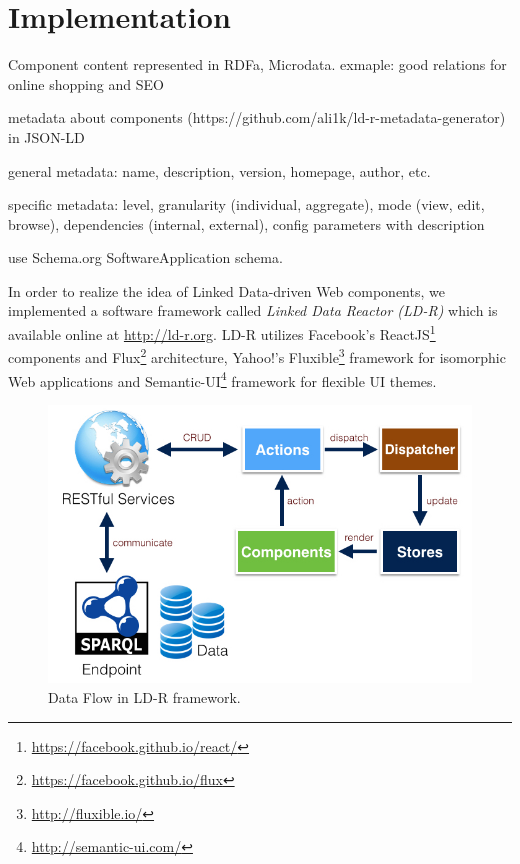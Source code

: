 \documentclass{acm_proc_article-sp}
\begin{document}
\section{Implementation}

Component content represented in RDFa, Microdata. exmaple: good relations for online shopping and SEO

metadata about components (https://github.com/ali1k/ld-r-metadata-generator) in JSON-LD

general metadata: name, description, version, homepage, author, etc.

specific metadata: level, granularity (individual, aggregate), mode (view, edit, browse), dependencies (internal, external), config parameters with description

use Schema.org SoftwareApplication schema.

In order to realize the idea of Linked Data-driven Web components, we implemented a software framework called \emph{Linked Data Reactor (LD-R)} which is available online at \url{http://ld-r.org}.
LD-R utilizes Facebook's ReactJS\footnote{\url{https://facebook.github.io/react/}} components and Flux\footnote{\url{https://facebook.github.io/flux}} architecture, Yahoo!'s Fluxible\footnote{\url{http://fluxible.io/}} framework for isomorphic Web applications and Semantic-UI\footnote{\url{http://semantic-ui.com/}} framework for flexible UI themes.


\begin{figure}[tb]
  \includegraphics[width=.9\linewidth]{images/dataflow.jpg}
  \caption{Data Flow in LD-R framework.}
  \label{fig:dataflow}
\end{figure}
\end{document}

